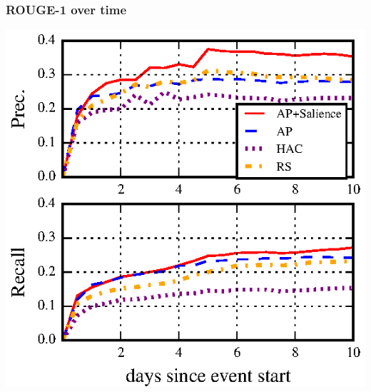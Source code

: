 \documentclass{beamer}
\begin{document}
\begin{frame}
\frametitle{ROUGE-1 over time}
\begin{center}
\includegraphics[]{images/rouge-time.eps}
\end{center}
\end{frame}
\end{document}
